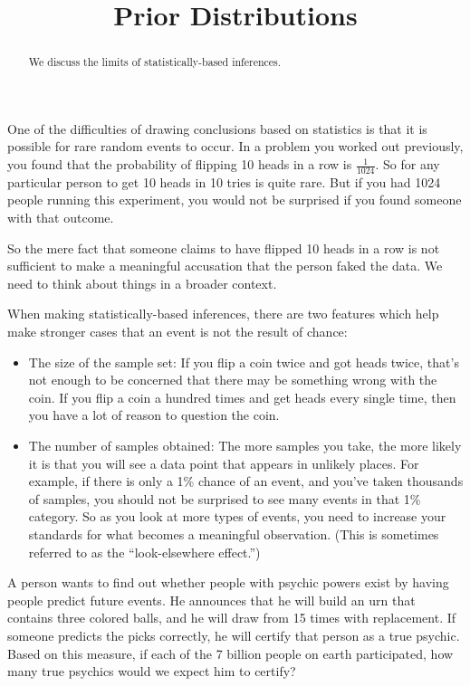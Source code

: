 \documentclass{ximera}
\title{Prior Distributions}
\begin{document}
\begin{abstract}
We discuss the limits of statistically-based inferences.
\end{abstract}
\maketitle

One of the difficulties of drawing conclusions based on statistics is that it is possible for rare random events to occur. In a problem you worked out previously, you found that the probability of flipping 10 heads in a row is $\frac{1}{1024}$. So for any particular person to get 10 heads in 10 tries is quite rare. But if you had 1024 people running this experiment, you would not be surprised if you found someone with that outcome.

So the mere fact that someone claims to have flipped 10 heads in a row is not sufficient to make a meaningful accusation that the person faked the data. We need to think about things in a broader context.

When making statistically-based inferences, there are two features which help make stronger cases that an event is not the result of chance:
\begin{itemize}
  \item The size of the sample set: If you flip a coin twice and got heads twice, that's not enough to be concerned that there may be something wrong with the coin. If you flip a coin a hundred times and get heads every single time, then you have a lot of reason to question the coin.
  \item The number of samples obtained: The more samples you take, the more likely it is that you will see a data point that appears in unlikely places. For example, if there is only a 1\% chance of an event, and you've taken thousands of samples, you should not be surprised to see many events in that 1\% category. So as you look at more types of events, you need to increase your standards for what becomes a meaningful observation. (This is sometimes referred to as the ``look-elsewhere effect.'')
\end{itemize}

\begin{question}
A person wants to find out whether people with psychic powers exist by having people predict future events. He announces that he will build an urn that contains three colored balls, and he will draw from 15 times with replacement. If someone predicts the picks correctly, he will certify that person as a true psychic. Based on this measure, if each of the 7 billion people on earth participated, how many true psychics would we expect him to certify?
  \begin{solution}
    \begin{multiple-choice}
    \end{multiple-choice}
  \end{solution}
\end{question}
\end{document}
